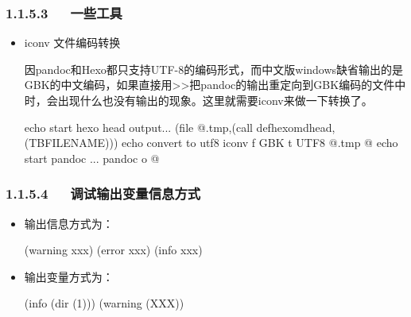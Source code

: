 \documentclass[letterpaper,12pt,english]{sphinxmanual}
\begin{document}
\subsubsection{1.1.5.3   一些工具}
\label{\detokenize{001software/001install/make:id17}}\begin{itemize}
\item {} 
iconv 文件编码转换

因pandoc和Hexo都只支持UTF-8的编码形式，而中文版windows缺省输出的是GBK的中文编码，如果直接用\textgreater{}\textgreater{}把pandoc的输出重定向到GBK编码的文件中时，会出现什么也没有输出的现象。这里就需要iconv来做一下转换了。

\begin{sphinxVerbatim}[commandchars=\\\{\}]
echo start hexo head output...
\PYGZdl{}\PYGZdl{}(file \PYGZgt{}\PYGZdl{}\PYGZdl{}@.tmp,\PYGZdl{}\PYGZdl{}(call def\PYGZus{}hexo\PYGZus{}md\PYGZus{}head,\PYGZdl{}\PYGZdl{}(TBFILENAME)))
echo convert to utf8
iconv \PYGZhy{}f GBK \PYGZhy{}t UTF\PYGZhy{}8 \PYGZdl{}\PYGZdl{}@.tmp \PYGZgt{}\PYGZdl{}\PYGZdl{}@
echo start pandoc ...
pandoc \PYGZdl{}\PYGZdl{}\PYGZlt{} \PYGZhy{}o \PYGZhy{} \PYGZgt{}\PYGZgt{}\PYGZdl{}\PYGZdl{}@
\end{sphinxVerbatim}

\end{itemize}


\subsubsection{1.1.5.4   调试输出变量信息方式}
\label{\detokenize{001software/001install/make:id18}}\begin{itemize}
\item {} 
输出信息方式为：

\begin{sphinxVerbatim}[commandchars=\\\{\}]
\PYGZdl{}(warning xxx)
\PYGZdl{}(error xxx)
\PYGZdl{}(info xxx)
\end{sphinxVerbatim}

\item {} 
输出变量方式为：

\begin{sphinxVerbatim}[commandchars=\\\{\}]
\PYGZdl{}(info \PYGZdl{}(dir \PYGZdl{}(1)))
\PYGZdl{}(warning  \PYGZdl{}(XXX))
\end{sphinxVerbatim}

\end{itemize}
\end{document}
